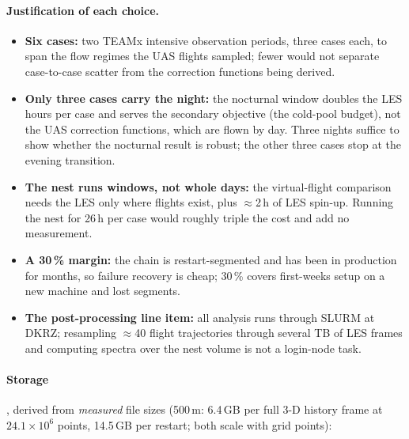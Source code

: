 \documentclass[10pt,a4paper]{article}
\begin{document}
\paragraph{Justification of each choice.}
\begin{itemize}
\item \textbf{Six cases:} two TEAMx intensive observation periods, three cases
  each, to span the flow regimes the UAS flights sampled; fewer would not
  separate case-to-case scatter from the correction functions being derived.
\item \textbf{Only three cases carry the night:} the nocturnal window doubles
  the LES hours per case and serves the secondary objective (the cold-pool
  budget), not the UAS correction functions, which are flown by day. Three
  nights suffice to show whether the nocturnal result is robust; the other three
  cases stop at the evening transition.
\item \textbf{The nest runs windows, not whole days:} the virtual-flight
  comparison needs the LES only where flights exist, plus $\approx$2\,h of LES
  spin-up. Running the nest for 26\,h per case would roughly triple the cost and
  add no measurement.
\item \textbf{A 30\,\% margin:} the chain is restart-segmented and has been in
  production for months, so failure recovery is cheap; 30\,\% covers first-weeks
  setup on a new machine and lost segments.
\item \textbf{The post-processing line item:} all analysis runs through SLURM at
  DKRZ; resampling $\approx$40 flight trajectories through several TB of LES
  frames and computing spectra over the nest volume is not a login-node task.
\end{itemize}

\paragraph{Storage}, derived from \emph{measured} file sizes (500\,m: 6.4\,GB per
full 3-D history frame at $24.1\times10^6$ points, 14.5\,GB per restart; both
scale with grid points):
\end{document}
